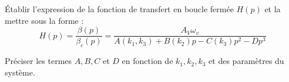 

\begin{question}
Établir l'expression de la fonction de transfert en boucle fermée $H(p)$ et la mettre sous la forme :
$$
H(p)=\frac{\beta(p)}{\beta_{c}(p)}=\frac{A_{V} \omega_{v}}{A\left(k_{1}, k_{3}\right)+B\left(k_{2}\right) p-C\left(k_{3}\right) p^{2}-D p^{3}}
$$

Préciser les termes $A, B, C$ et $D$ en fonction de $k_{1}, k_{2}, k_{3}$ et des paramètres du système.\\
\end{question}
\ifprof
